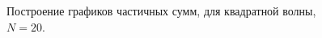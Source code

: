 \documentclass[a5paper, 10pt]{article}
\theoremstyle{definition}
\theoremstyle{plain}
\theoremstyle{remark}
\begin{document}
\begin{figure}[h]
\begin{minipage}[h]{0.5\linewidth}
\end{minipage}
\hfill
\begin{minipage}[h]{0.5\linewidth}
\end{minipage}
\caption{Построение графиков частичных сумм, для квадратной волны, $N=20$.}


\end{figure}
\end{document}
